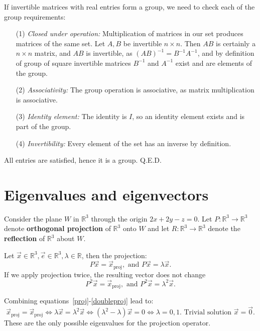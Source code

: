 \documentclass{article}
\begin{document}
If invertible matrices with real entries form a group, we need to check each of the group requirements:
\begin{itemize}
\item[(1)] \textit{Closed under operation:} Multiplication of matrices in our set produces matrices of the same set. Let $A, B$ be invertible $n\times n$. Then $A B$ is certainly a $n \times n$ matrix, and $A B$ is invertible, as $(A B)^{-1}=B^{-1} A^{-1}$, and by definition of group of square invertible matrices $B^{-1}$ and $A^{-1}$ exist and are elements of the group.
\item[(2)] \textit{Associativity: }The group operation is associative, as matrix multiplication is associative.
\item[(3)] \textit{Identity element: }The identity is $I$, so an identity element exists and is part of the group.
\item[(4)] \textit{Invertibility:} Every element of the set has an inverse by definition.
\end{itemize}

All entries are satisfied, hence it is a group. Q.E.D.

\section{Eigenvalues and eigenvectors}

Consider the plane $W$ in $\mathbb{R}^3$ through the origin $2x+2y-z=0$. Let $P:\mathbb{R}^3\to\mathbb{R}^3$ denote \textbf{orthogonal projection} of $\mathbb{R}^3$ onto $W$ and let $R:\mathbb{R}^3\to\mathbb{R}^3$ denote the \textbf{reflection} of $\mathbb{R}^3$ about $W$. 

Let $\vec{x}\in\mathbb{R}^3, \vec{e}\in \mathbb{R}^3, \lambda\in \mathbb{R}$, then the projection:
\begin{equation}\label{proj}
	P\vec{x}=\vec{x}_{\operatorname{proj}},\text{ and }P\vec{x}=\lambda\vec{x}.
\end{equation}
If we apply projection twice, the resulting vector does not change
\begin{equation}\label{doubleproj}
	P^2\vec{x}=\vec{x}_{\operatorname{proj}},\text{ and }P^2\vec{x}=\lambda^2\vec{x}	.
\end{equation}

Combining equations~\eqref{proj}-\eqref{doubleproj} lead to:
\begin{equation*}
	\vec{x}_{\operatorname{proj}}=\vec{x}_{\operatorname{proj}}\iff\lambda \vec{x}=\lambda^2\vec{x}\iff \left(\lambda^2-\lambda\right)\vec{x}=0\iff \lambda=0,1. \text{ Trivial solution }\vec{x}=\vec{0}.
\end{equation*}
These are the only possible eigenvalues for the projection operator. 
\end{document}

